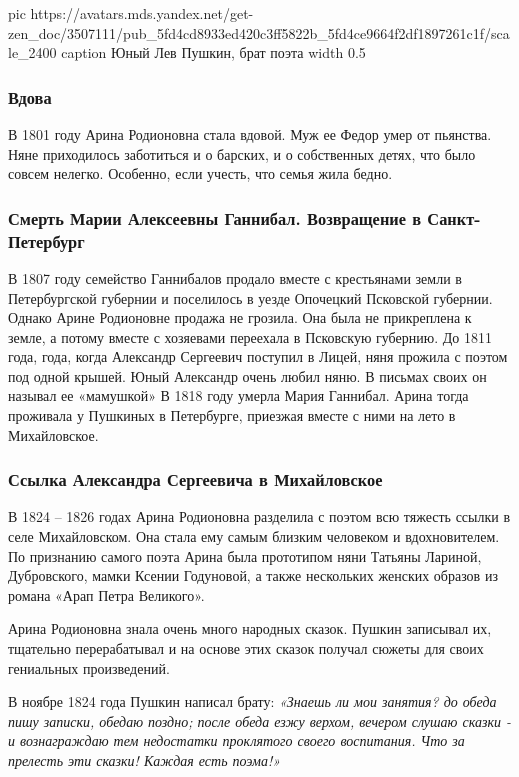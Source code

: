\ifcmt
  pic https://avatars.mds.yandex.net/get-zen_doc/3507111/pub_5fd4cd8933ed420c3ff5822b_5fd4ce9664f2df1897261c1f/scale_2400
  caption Юный Лев Пушкин, брат поэта
  width 0.5
\fi

\subsubsection{Вдова}

В 1801 году Арина Родионовна стала вдовой. Муж ее Федор умер от пьянства. Няне
приходилось заботиться и о барских, и о собственных детях, что было совсем
нелегко. Особенно, если учесть, что семья жила бедно.

\subsubsection{Смерть Марии Алексеевны Ганнибал. Возвращение в Санкт-Петербург}

В 1807 году семейство Ганнибалов продало вместе с крестьянами земли в
Петербургской губернии и поселилось в уезде Опочецкий Псковской губернии.
Однако Арине Родионовне продажа не грозила. Она была не прикреплена к земле, а
потому вместе с хозяевами переехала в Псковскую губернию. До 1811 года, года,
когда Александр Сергеевич поступил в Лицей, няня прожила с поэтом под одной
крышей. Юный Александр очень любил няню. В письмах своих он называл ее
«мамушкой» В 1818 году умерла Мария Ганнибал. Арина тогда проживала у Пушкиных
в Петербурге, приезжая вместе с ними на лето в Михайловское.

\subsubsection{Ссылка Александра Сергеевича в Михайловское}

В 1824 – 1826 годах Арина Родионовна разделила с поэтом всю тяжесть ссылки в
селе Михайловском. Она стала ему самым близким человеком и вдохновителем. По
признанию самого поэта Арина была прототипом няни Татьяны Лариной, Дубровского,
мамки Ксении Годуновой, а также нескольких женских образов из романа «Арап
Петра Великого».

Арина Родионовна знала очень много народных сказок. Пушкин записывал их,
тщательно перерабатывал и на основе этих сказок получал сюжеты для своих
гениальных произведений.

В ноябре 1824 года Пушкин написал брату: \emph{«Знаешь ли мои занятия? до обеда пишу
записки, обедаю поздно; после обеда езжу верхом, вечером слушаю сказки - и
вознаграждаю тем недостатки проклятого своего воспитания. Что за прелесть эти
сказки! Каждая есть поэма!»}

